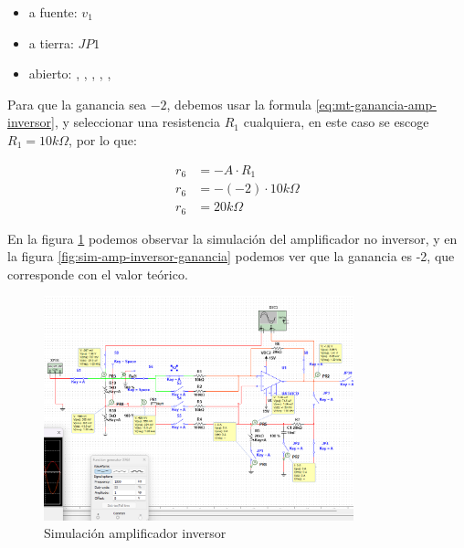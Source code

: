 \begin{itemize}
    \item a fuente: $v_1$
    \item a tierra: $JP1$
    \item abierto: , , , , , 
\end{itemize}

Para que la ganancia sea $-2$, debemos usar la formula \ref{eq:mt-ganancia-amp-inversor}, y seleccionar una resistencia $R_1$ cualquiera, en este caso se escoge $R_1 = 10k\Omega$, por lo que:

\begin{align*}
    r_6 &= -A \cdot R_1 \\
    r_6 &= - (-2) \cdot 10k\Omega \\
    r_6 &= 20k\Omega
\end{align*}

En la figura \ref{fig:sim-amp-inversor} podemos observar la simulación del amplificador no inversor, y en la figura \ref{fig:sim-amp-inversor-ganancia} podemos ver que la ganancia es -2, que corresponde con el valor teórico.

\begin{figure}[ht]
    \centering
    \includegraphics[width=0.8\textwidth]{src/images/simulaciones/amp-inversor.png}
    \caption{Simulación amplificador inversor}
    \label{fig:sim-amp-inversor}
\end{figure}

